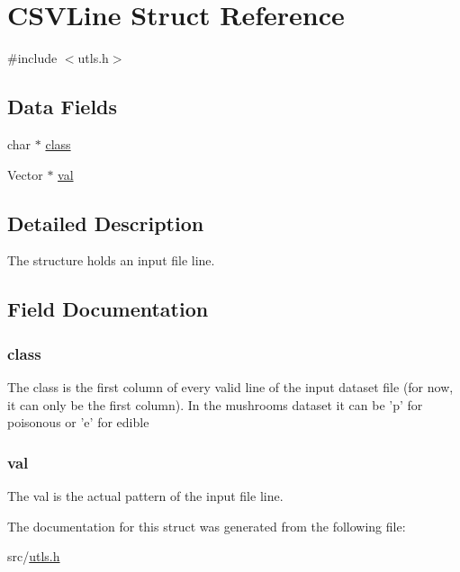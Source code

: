 \hypertarget{struct_c_s_v_line}{\section{C\-S\-V\-Line Struct Reference}
\label{struct_c_s_v_line}
}


{\ttfamily \#include $<$utls.\-h$>$}

\subsection*{Data Fields}
\begin{DoxyCompactItemize}
\item 
char $\ast$ \hyperlink{struct_c_s_v_line_a185c73c6507391d1eb38c776b68ce96d}{class}
\item 
Vector $\ast$ \hyperlink{struct_c_s_v_line_acb906433e1289aa1c251dc5057746a88}{val}
\end{DoxyCompactItemize}


\subsection{Detailed Description}
The structure holds an input file line. 

\subsection{Field Documentation}
\hypertarget{struct_c_s_v_line_a185c73c6507391d1eb38c776b68ce96d}{
\subsubsection[{class}]{\setlength{\rightskip}{0pt plus 5cm}class}}\label{struct_c_s_v_line_a185c73c6507391d1eb38c776b68ce96d}
The class is the first column of every valid line of the input dataset file (for now, it can only be the first column). In the mushrooms dataset it can be 'p' for poisonous or 'e' for edible \hypertarget{struct_c_s_v_line_acb906433e1289aa1c251dc5057746a88}{
\subsubsection[{val}]{\setlength{\rightskip}{0pt plus 5cm}val}}\label{struct_c_s_v_line_acb906433e1289aa1c251dc5057746a88}
The val is the actual pattern of the input file line. 

The documentation for this struct was generated from the following file\-:\begin{DoxyCompactItemize}
\item 
src/\hyperlink{utls_8h}{utls.\-h}\end{DoxyCompactItemize}
